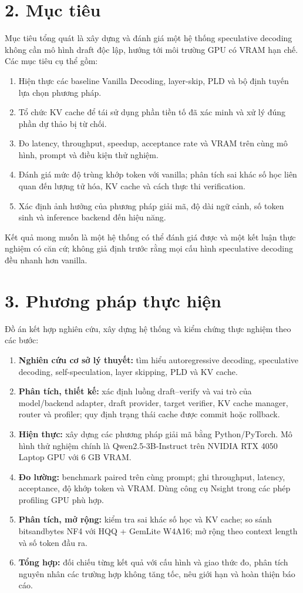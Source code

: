 \section*{2. Mục tiêu}
Mục tiêu tổng quát là xây dựng và đánh giá một hệ thống speculative decoding không cần mô hình draft độc lập, hướng tới môi trường GPU có VRAM hạn chế. Các mục tiêu cụ thể gồm:
\begin{enumerate}
    \item Hiện thực các baseline Vanilla Decoding, layer-skip, PLD và bộ định tuyến lựa chọn phương pháp.
    \item Tổ chức KV cache để tái sử dụng phần tiền tố đã xác minh và xử lý đúng phần dự thảo bị từ chối.
    \item Đo latency, throughput, speedup, acceptance rate và VRAM trên cùng mô hình, prompt và điều kiện thử nghiệm.
    \item Đánh giá mức độ trùng khớp token với vanilla; phân tích sai khác số học liên quan đến lượng tử hóa, KV cache và cách thực thi verification.
    \item Xác định ảnh hưởng của phương pháp giải mã, độ dài ngữ cảnh, số token sinh và inference backend đến hiệu năng.
\end{enumerate}
Kết quả mong muốn là một hệ thống có thể đánh giá được và một kết luận thực nghiệm có căn cứ; không giả định trước rằng mọi cấu hình speculative decoding đều nhanh hơn vanilla.

\section*{3. Phương pháp thực hiện}
Đồ án kết hợp nghiên cứu, xây dựng hệ thống và kiểm chứng thực nghiệm theo các bước:
\begin{enumerate}
    \item \textbf{Nghiên cứu cơ sở lý thuyết:} tìm hiểu autoregressive decoding, speculative decoding, self-speculation, layer skipping, PLD và KV cache.
    \item \textbf{Phân tích, thiết kế:} xác định luồng draft--verify và vai trò của model/backend adapter, draft provider, target verifier, KV cache manager, router và profiler; quy định trạng thái cache được commit hoặc rollback.
    \item \textbf{Hiện thực:} xây dựng các phương pháp giải mã bằng Python/PyTorch. Mô hình thử nghiệm chính là Qwen2.5-3B-Instruct trên NVIDIA RTX 4050 Laptop GPU với 6 GB VRAM.
    \item \textbf{Đo lường:} benchmark paired trên cùng prompt; ghi throughput, latency, acceptance, độ khớp token và VRAM. Dùng công cụ Nsight trong các phép profiling GPU phù hợp.
    \item \textbf{Phân tích, mở rộng:} kiểm tra sai khác số học và KV cache; so sánh bitsandbytes NF4 với HQQ + GemLite W4A16; mở rộng theo context length và số token đầu ra.
    \item \textbf{Tổng hợp:} đối chiếu từng kết quả với cấu hình và giao thức đo, phân tích nguyên nhân các trường hợp không tăng tốc, nêu giới hạn và hoàn thiện báo cáo.
\end{enumerate}

